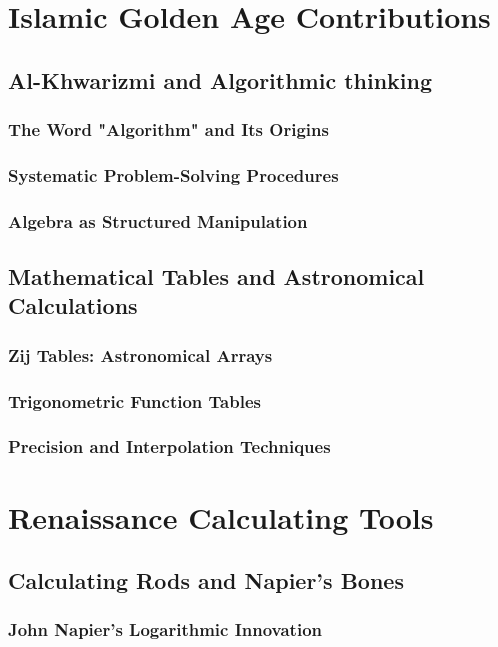 \documentclass[12pt, oneside]{book}
\begin{document}
\section{Islamic Golden Age Contributions}
\subsection{Al-Khwarizmi and Algorithmic thinking}
\subsubsection{The Word "Algorithm" and Its Origins}
\subsubsection{Systematic Problem-Solving Procedures}
\subsubsection{Algebra as Structured Manipulation}

\subsection{Mathematical Tables and Astronomical Calculations}
\subsubsection{Zij Tables: Astronomical Arrays}
\subsubsection{Trigonometric Function Tables}
\subsubsection{Precision and Interpolation Techniques}

\section{Renaissance Calculating Tools}
\subsection{Calculating Rods and Napier's Bones}
\subsubsection{John Napier's Logarithmic Innovation}
\end{document}
